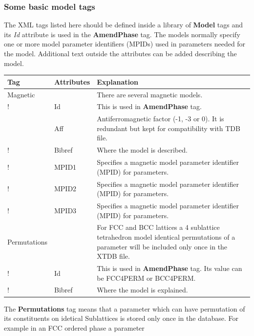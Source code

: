 \documentclass{article}
\begin{document}
\subsubsection{Some basic model tags}

The XML tags listed here should be defined inside a library of {\bf
  Model} tags and its {\em Id} attribute is used in the {\bf
  AmendPhase} tag.  The models normally specify one or more model
parameter identifiers (MPIDs) used in parameters needed for the model.
Additional text outside the attributes can be added describing the
model.

\bigskip
\begin{tabular}{|p{} p{} p{}|}\hline
  Tag & Attributes & Explanation\\\hline

  Magnetic & & There are several magnetic models.\\
!      & Id & This is used in {\bf AmendPhase} tag.\\
      & Aff   & Antiferromagnetic factor (-1, -3 or 0).  It is
                    redundant but kept for compatibility with TDB file.\\
!      & Bibref & Where the model is described.\\
!      & MPID1 & Specifies a magnetic model parameter 
                    identifier (MPID) for parameters.\\
!      & MPID2 & Specifies a magnetic model parameter 
                    identifier (MPID) for parameters.\\
!      & MPID3 & Specifies a magnetic model parameter 
                    identifier (MPID) for parameters.\\\hline

 Permutations & & For FCC and BCC lattices a 4 sublattice tetrahedron model
                  identical permutations of a parameter will be included 
                  only once in the XTDB file.\\
!     & Id & This is used in {\bf AmendPhase} tag.  Its value can be
                  FCC4PERM or BCC4PERM.\\
!     & Bibref & Where the model is explained.\\\hline

\end{tabular}

The {\bf Permutations} tag means that a parameter which can have
permutation of its constituents on idetical Sublattices is stored only once
in the database.  For example in an FCC ordered phase a parameter
\end{document}
